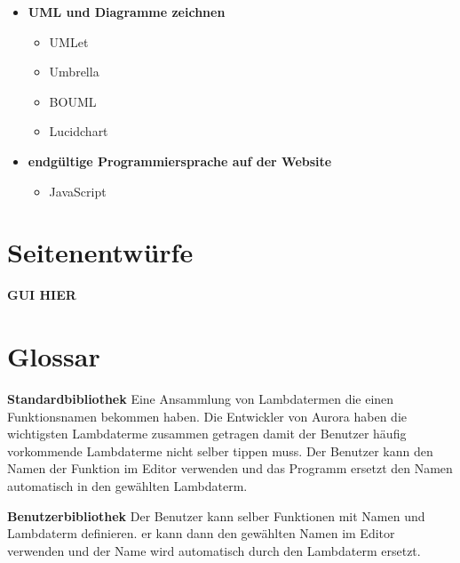 \documentclass[parskip=full,11pt,twoside]{scrartcl}
\begin{document}
\begin{description}
\begin{itemize}
\begin{itemize}
			\end{itemize}
		\item \textbf{UML und Diagramme zeichnen}
			\begin{itemize}
				\item UMLet
				\item Umbrella
				\item BOUML
				\item Lucidchart
			\end{itemize}
		\item \textbf{endgültige Programmiersprache auf der Website}
			\begin{itemize}
				\item JavaScript
			\end{itemize}
	\end{itemize}
\newpage
\appendix
\end{description}
\section{Seitenentwürfe}
\textbf{GUI HIER}


\newpage
\section{Glossar}

\textbf{Standardbibliothek}
\newline
Eine Ansammlung von Lambdatermen die einen Funktionsnamen bekommen haben. Die Entwickler von Aurora haben die wichtigsten Lambdaterme zusammen getragen damit der Benutzer häufig vorkommende Lambdaterme nicht selber tippen muss. Der Benutzer kann den Namen der Funktion im Editor verwenden und das Programm ersetzt den Namen automatisch in den gewählten Lambdaterm.

\textbf{Benutzerbibliothek}
\newline
Der Benutzer kann selber Funktionen mit Namen und Lambdaterm definieren. er kann dann den gewählten Namen im Editor verwenden und der Name wird automatisch durch den Lambdaterm ersetzt.
\end{document}
